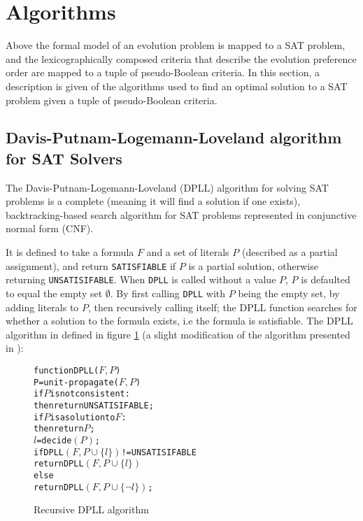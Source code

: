 \section{Algorithms}
\label{impl.algorithms}
Above the formal model of an evolution problem is mapped to a SAT problem, 
and the lexicographically composed criteria that describe the evolution preference order are mapped to a tuple of pseudo-Boolean criteria.
In this section, a description is given of the algorithms used to find an optimal solution to a SAT problem given a tuple of pseudo-Boolean criteria. 

\subsection{Davis-Putnam-Logemann-Loveland algorithm for SAT Solvers}
The Davis-Putnam-Logemann-Loveland (DPLL) algorithm \citep{Davis1960, davis1962machine} for solving SAT problems is a complete (meaning it will find a solution if one exists), 
backtracking-based search algorithm for SAT problems represented in conjunctive normal form (CNF).

It is defined to take a formula $F$ and a set of literals $P$ (described as a partial assignment), and return \verb+SATISFIABLE+ if $P$ is a partial solution, 
otherwise returning \verb+UNSATISIFABLE+.
When \texttt{DPLL} is called without a value $P$, $P$ is defaulted to equal the empty set $\emptyset$.
By first calling \texttt{DPLL} with $P$ being the empty set, by adding literals to $P$, then recursively calling itself; 
the DPLL function searches for whether a solution to the formula exists, 
i.e the formula is satisfiable.
The DPLL algorithm in defined in figure \ref{impl.DPLL} (a slight modification of the algorithm presented in \citep{dixon2004automating}):
\begin{figure}[h]
\begin{center}
\begin{alltt}
function DPLL(\(F, P\))
   P = unit-propagate(\(F, P\))
   if \(P\) is not consistent:
       then return UNSATISIFABLE;
   if \(P\) is a solution to \(F\):
       then return \(P\);
   \(l\) = decide\((P)\);
   if DPLL\((F, P \cup \{l\})\) != UNSATISIFABLE 
       return DPLL\((F, P \cup \{l\})\)
   else
       return DPLL\((F, P \cup \{\neg l\})\);
\end{alltt}
  \caption{Recursive DPLL algorithm}
  \label{impl.DPLL}
\end{center}
\end{figure}

